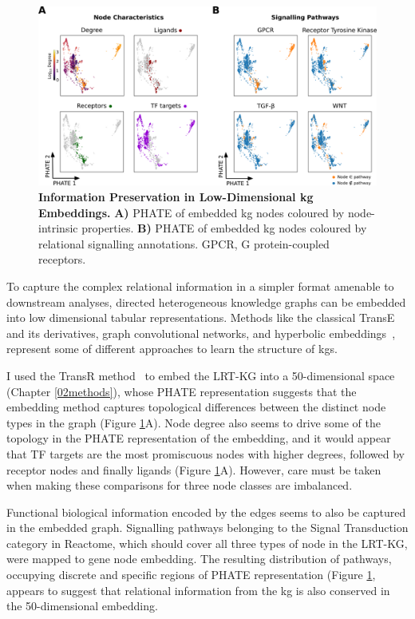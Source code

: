 \begin{figure}[H]
    \centering
    \includegraphics{06kg/figs/6KG_embed.png}
    \caption{\textbf{Information Preservation in Low-Dimensional \acrshort{kg} Embeddings.} \textbf{A)} PHATE of embedded \acrshort{kg} nodes coloured by node-intrinsic properties. \textbf{B)} PHATE of embedded \acrshort{kg} nodes coloured by relational signalling annotations. GPCR, G protein-coupled receptors.}
    \label{fig:6embed}
\end{figure}

To capture the complex relational information in a simpler format amenable to downstream analyses, directed heterogeneous knowledge graphs can be embedded into low dimensional tabular representations. Methods like the classical TransE~\cite{bordes_translating_2013} and its derivatives, graph convolutional networks, and hyperbolic embeddings~\cite{chami_hyperbolic_2019}, represent some of different approaches to learn the structure of \acrshort{kg}s.

I used the TransR method~\cite{zhang_transr_2021} to embed the LRT-KG into a 50-dimensional space (Chapter \ref{02methods}), whose PHATE representation suggests that the embedding method captures topological differences between the distinct node types in the graph (Figure \ref{fig:6embed}A). Node degree also seems to drive some of the topology in the PHATE representation of the embedding, and it would appear that TF targets are the most promiscuous nodes with higher degrees, followed by receptor nodes and finally ligands (Figure \ref{fig:6embed}A). However, care must be taken when making these comparisons for three node classes are imbalanced.

Functional biological information encoded by the edges seems to also be captured in the embedded graph. Signalling pathways belonging to the Signal Transduction category in Reactome, which should cover all three types of node in the LRT-KG, were mapped to gene node embedding. The resulting distribution of pathways, occupying discrete and specific regions of PHATE representation (Figure \ref{fig:6embed}, appears to suggest that relational information from the \acrshort{kg} is also conserved in the 50-dimensional embedding.

